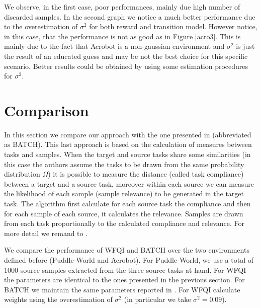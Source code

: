     \noindent We observe, in the first case, poor performances, mainly due high number of discarded samples.
    In the second graph we notice a much better performance due to the overestimation of $\sigma^{2}$ for
    both reward and transition model. However notice, in this case, that the performance is not as good as
    in Figure \ref{acro3}. This is mainly due to the fact that Acrobot is a non-gaussian environment
    and $\sigma^{2}$ is just the result of an educated guess and may be not the best choice for this specific
    scenario. Better results could be obtained by using some estimation procedures for $\sigma^{2}$.

  \section{Comparison}
    \noindent In this section we compare our approach with the one presented in \cite{lazaric2008transfer} (abbreviated as BATCH). This
    last approach is based on the calculation of measures between tasks and samples. When the target and source
    tasks share some similarities (in this case the authors assume the tasks to be drawn from the same probability
    distribution $\Omega$) it is possible to measure the distance (called task compliance) between a target and
    a source task, moreover within each source we can measure the likelihood of each sample (sample relevance) to be generated
    in the target task. The algorithm first calculate for each source task the compliance and then for each sample of
    each source, it calculates the relevance. Samples are drawn from each task proportionally to the calculated compliance
    and relevance. For more detail we remand to \cite{lazaric2008transfer}.\newline

    \noindent We compare the performance of WFQI and BATCH over the two environments defined before (Puddle-World and Acrobot).\newline
    For Puddle-World, we use a total of 1000 source samples extracted from the three source tasks at hand. For WFQI the parameters
    are identical to the ones presented in the previous section. For BATCH we maintain the same parameters reported in \cite{lazaric2008transfer}.
    For WFQI calculate weights using the overestimation of $\sigma^{2}$ (in particular we take $\sigma^{2} = 0.09$).


